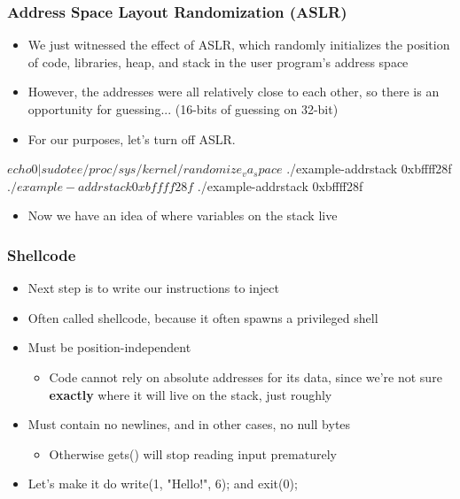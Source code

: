 \documentclass[11pt,xcolor=dvipsnames]{beamer}
\newcommand{\vs}{\vspace{0.5em}}
\begin{document}
\begin{frame}[fragile,t]
\frametitle{Address Space Layout Randomization (ASLR)}
\begin{itemize}
  \item We just witnessed the effect of ASLR, which randomly initializes the position of code, libraries, heap, and stack in the user program's address space
  \item However, the addresses were all relatively close to each other, so there is an opportunity for guessing... (16-bits of guessing on 32-bit)
\pause
  \item For our purposes, let's turn off ASLR.
\end{itemize}
\vs
\begin{textcode}
$ echo 0 | sudo tee /proc/sys/kernel/randomize_va_space
$ ./example-addrstack
0xbffff28f
$ ./example-addrstack
0xbffff28f
$ ./example-addrstack
0xbffff28f
\end{textcode}
\begin{itemize}
  \item Now we have an idea of where variables on the stack live
\end{itemize}
\end{frame}

\begin{frame}[fragile,t]
\frametitle{Shellcode}
\begin{itemize}
  \item Next step is to write our instructions to inject
  \item Often called shellcode, because it often spawns a privileged shell
  \pause
  \vs\vs
  \item Must be position-independent
  \begin{itemize}
    \item Code cannot rely on absolute addresses for its data, since we're not sure {\bf exactly} where it will live on the stack, just roughly
  \end{itemize}
  \pause
  \item Must contain no newlines, and in other cases, no null bytes
  \begin{itemize}
    \item Otherwise {\ttfamily gets()} will stop reading input prematurely
  \end{itemize}
  \pause
  \vs
  \item Let's make it do {\ttfamily write(1, "Hello!", 6);} and {\ttfamily exit(0);}
\end{itemize}
\end{frame}
\end{document}
